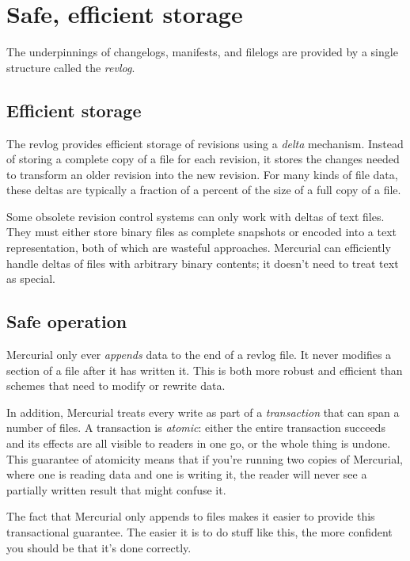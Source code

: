 \section{Safe, efficient storage}

The underpinnings of changelogs, manifests, and filelogs are provided
by a single structure called the \emph{revlog}.

\subsection{Efficient storage}

The revlog provides efficient storage of revisions using a
\emph{delta} mechanism.  Instead of storing a complete copy of a file
for each revision, it stores the changes needed to transform an older
revision into the new revision.  For many kinds of file data, these
deltas are typically a fraction of a percent of the size of a full
copy of a file.

Some obsolete revision control systems can only work with deltas of
text files.  They must either store binary files as complete snapshots
or encoded into a text representation, both of which are wasteful
approaches.  Mercurial can efficiently handle deltas of files with
arbitrary binary contents; it doesn't need to treat text as special.

\subsection{Safe operation}
\label{sec:concepts:txn}

Mercurial only ever \emph{appends} data to the end of a revlog file.
It never modifies a section of a file after it has written it.  This
is both more robust and efficient than schemes that need to modify or
rewrite data.

In addition, Mercurial treats every write as part of a
\emph{transaction} that can span a number of files.  A transaction is
\emph{atomic}: either the entire transaction succeeds and its effects
are all visible to readers in one go, or the whole thing is undone.
This guarantee of atomicity means that if you're running two copies of
Mercurial, where one is reading data and one is writing it, the reader
will never see a partially written result that might confuse it.

The fact that Mercurial only appends to files makes it easier to
provide this transactional guarantee.  The easier it is to do stuff
like this, the more confident you should be that it's done correctly.

